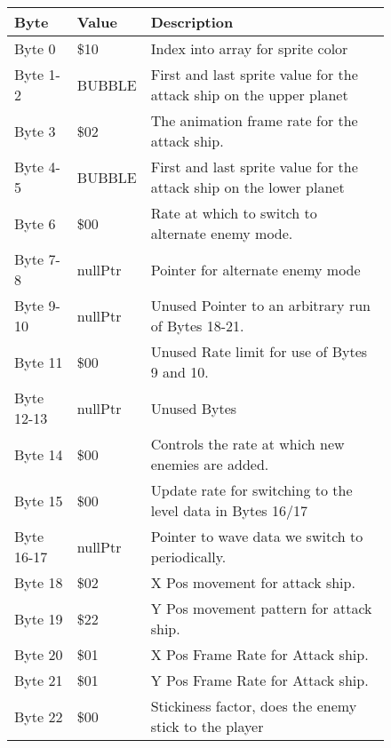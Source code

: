 \begin{figure}[H]
{\begin{adjustbox}{width=12cm}
\begin{tabular}{lll}
\toprule
 Byte       & Value              & Description                                                         \\
\midrule
 Byte 0     & \$10                & Index into array for sprite color                                   \\
 Byte 1-2   & BUBBLE             & First and last sprite value for the attack ship on the upper planet \\
 Byte 3     & \$02                & The animation frame rate for the attack ship.                       \\
 Byte 4-5   & BUBBLE             & First and last sprite value for the attack ship on the lower planet \\
 Byte 6     & \$00                & Rate at which to switch to alternate enemy mode.                    \\
 Byte 7-8   & nullPtr            & Pointer for alternate enemy mode                                    \\
 Byte 9-10  & nullPtr            & Unused Pointer to an arbitrary run of Bytes 18-21.                  \\
 Byte 11    & \$00                & Unused Rate limit for use of Bytes 9 and 10.                        \\
 Byte 12-13 & nullPtr            & Unused Bytes                                                        \\
 Byte 14    & \$00                & Controls the rate at which new enemies are added.                   \\
 Byte 15    & \$00                & Update rate for switching to the level data in Bytes 16/17          \\
 Byte 16-17 & nullPtr            & Pointer to wave data we switch to periodically.                     \\
 Byte 18    & \$02                & X Pos movement for attack ship.                                     \\
 Byte 19    & \$22                & Y Pos movement pattern for attack ship.                             \\
 Byte 20    & \$01                & X Pos Frame Rate for Attack ship.                                   \\
 Byte 21    & \$01                & Y Pos Frame Rate for Attack ship.                                   \\
 Byte 22    & \$00                & Stickiness factor, does the enemy stick to the player               \\

\end{tabular}
\end{adjustbox}}
\end{figure}
